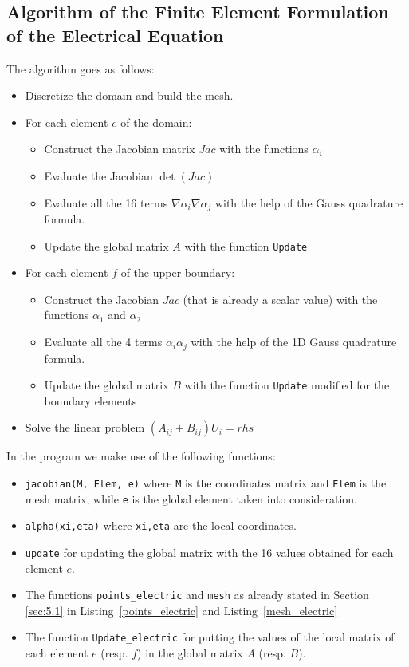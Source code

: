 \subsection{Algorithm of the Finite Element Formulation of the Electrical Equation}
\begin{mdframed}
	The algorithm goes as follows:
	\begin{itemize}
		\item Discretize the domain and build the mesh.
		\item For each element $ e $ of the domain:
		\begin{itemize}
			\item Construct the Jacobian matrix $ Jac $ with the functions $ \alpha_i $
			\item Evaluate the Jacobian $ \det(Jac) $
			\item Evaluate all the 16 terms $ \nabla\alpha_i\nabla\alpha_j $ with the help of the Gauss quadrature formula.
			\item Update the global matrix $ A $ with the function \texttt{Update}
		\end{itemize}
		\item For each element $ f $ of the upper boundary:
		\begin{itemize}
			\item Construct the Jacobian $ Jac $ (that is already a scalar value) with the functions $ \alpha_1 $ and $ \alpha_2 $
			\item Evaluate all the 4 terms $ \alpha_i\alpha_j $ with the help of the 1D Gauss quadrature formula.
			\item Update the global matrix $ B $ with the function \texttt{Update} modified for the boundary elements
		\end{itemize}
		\item Solve the linear problem $ (A_{ij}+B_{ij})U_i = rhs $
	\end{itemize}
\end{mdframed}


In the program we make use of the following functions:
\begin{itemize}
	\item \texttt{jacobian(M, Elem, e)} where \texttt{M} is the coordinates matrix and \texttt{Elem} is the mesh matrix, while \texttt{e} is the global element taken into consideration.
	\item \texttt{alpha(xi,eta)} where \texttt{xi,eta} are the local coordinates.
	\item \texttt{update} for updating the global matrix with the 16 values obtained for each element $ e $. 
	\item The functions \texttt{points\_electric} and \texttt{mesh} as already stated in Section \ref{sec:5.1} in Listing~\ref{points_electric} and Listing~\ref{mesh_electric} 
	\item The function \texttt{Update\_electric} for putting the values of the local matrix of each element $ e $ (resp. $ f $) in the global matrix $ A $ (resp. $ B $).
\end{itemize}



